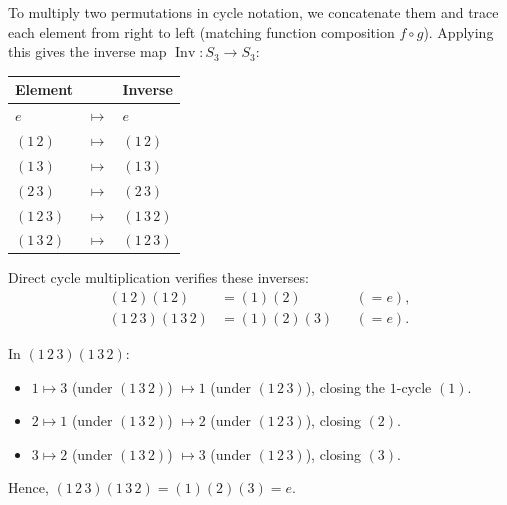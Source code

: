 \begin{content}
To multiply two permutations in cycle notation, we concatenate them and trace each element from right to left (matching function composition $f \circ g$). Applying this gives the inverse map $\operatorname{Inv} \colon S_3 \to S_3$:
\begin{center}
\begin{tabular}{l c l}
    \toprule
    \textbf{Element} & & \textbf{Inverse} \\
    \midrule
    $e$          & $\longmapsto$ & $e$ \\
    $(1\,2)$     & $\longmapsto$ & $(1\,2)$ \\
    $(1\,3)$     & $\longmapsto$ & $(1\,3)$ \\
    $(2\,3)$     & $\longmapsto$ & $(2\,3)$ \\
    $(1\,2\,3)$  & $\longmapsto$ & $(1\,3\,2)$ \\
    $(1\,3\,2)$  & $\longmapsto$ & $(1\,2\,3)$ \\
    \bottomrule
\end{tabular}
\end{center}
Direct cycle multiplication verifies these inverses:
\begin{align*}
(1\,2)(1\,2) &= (1)(2) && (= e), \\
(1\,2\,3)(1\,3\,2) &= (1)(2)(3) && (= e).
\end{align*}

\begin{steps}
In $(1\,2\,3)(1\,3\,2)$:
\begin{itemize}
    \item $1 \mapsto 3$ (under $(1\,3\,2)$) $\mapsto 1$ (under $(1\,2\,3)$), closing the $1$-cycle $(1)$.
    \item $2 \mapsto 1$ (under $(1\,3\,2)$) $\mapsto 2$ (under $(1\,2\,3)$), closing $(2)$.
    \item $3 \mapsto 2$ (under $(1\,3\,2)$) $\mapsto 3$ (under $(1\,2\,3)$), closing $(3)$.
\end{itemize}
Hence, $(1\,2\,3)(1\,3\,2) = (1)(2)(3) = e$.
\end{steps}
\end{content}

